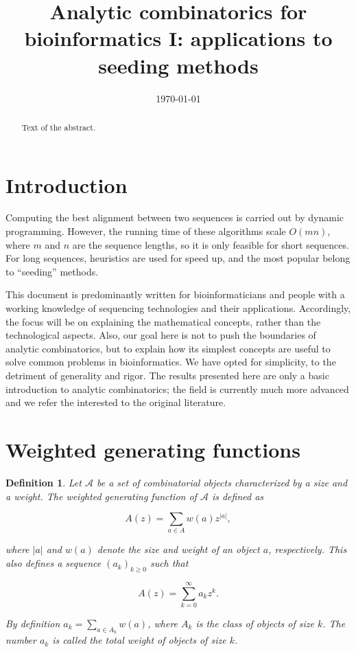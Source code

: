 \documentclass{article}
\title{Analytic combinatorics for bioinformatics I: applications to
seeding methods}
\date{\today}
\newtheorem{definition}{Definition}
\begin{document}
\maketitle

\begin{abstract}
Text of the abstract.
\end{abstract}



\section{Introduction}

Computing the best alignment between two sequences is carried out by
dynamic programming. However, the running time of these algorithms scale
$O(mn)$, where $m$ and $n$ are the sequence lengths, so it is only
feasible for short sequences. For long sequences, heuristics are used for
speed up, and the most popular belong to ``seeding'' methods.

This document is predominantly written for bioinformaticians and people
with a working knowledge of sequencing technologies and their applications.
Accordingly, the focus will be on explaining the mathematical concepts,
rather than the technological aspects. Also, our goal here is not to push
the boundaries of analytic combinatorics, but to explain how its simplest
concepts are useful to solve common problems in bioinformatics. We have
opted for simplicity, to the detriment of generality and rigor. The
results presented here are only a basic introduction to analytic
combinatorics; the field is currently much more advanced and we refer the
interested to the original literature.

\section{Weighted generating functions}
\label{sec:WGF}

\begin{definition}
\label{def:GF}
Let $\mathcal{A}$ be a set of combinatorial objects characterized by a
size and a weight. The weighted generating function of $\mathcal{A}$ is
defined as

\begin{equation}
\label{eq:GF1}
A(z) = \sum_{a \in A} w(a) z^{|a|},
\end{equation}

\noindent
where $|a|$ and $w(a)$ denote the size and weight of an object $a$,
respectively. This also defines a sequence $(a_k)_{k \geq 0}$ such that 

\begin{equation}
\label{eq:GF2}
A(z) = \sum_{k=0}^\infty a_k z^k.
\end{equation}

By definition $a_k = \sum_{a \in A_k}w(a)$, where $A_k$ is the class of
objects of size $k$. The number $a_k$ is called the total weight of
objects of size $k$.
\end{definition}
\end{document}
